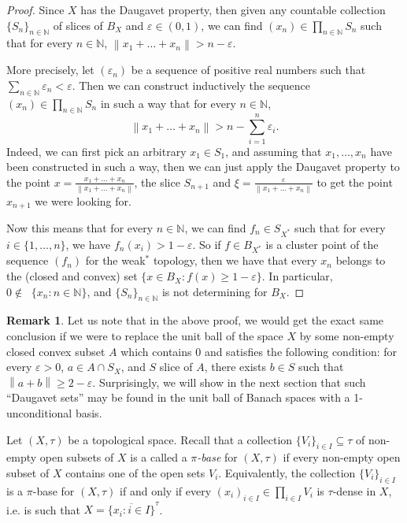 \documentclass[11pt,a4paper,reqno]{amsart}
\numberwithin{equation}{section}
\newcommand{\norm}[1]{\left\lVert#1\right\rVert}
\newcommand{\N}{\mathbb{N}}
\newcommand{\eps}{\varepsilon}
\DeclareMathOperator{\cconv}{\overline{conv}}
\newcommand{\1}{\mathbbm{1}}
\renewcommand{\geq}{\geqslant}
\theoremstyle{plain}
\theoremstyle{definition}
\newtheorem{remark}[theorem]{Remark}
\begin{document}
\begin{proof}
Since $X$ has the Daugavet property, then given any countable collection $\{S_n\}_{n\in \N}$ of slices of $B_X$ and $\eps\in(0,1)$, we can find $(x_n)\in \prod_{n\in\N} S_n$ such that for every $n\in\N$, $\norm{x_1+\dots+x_n}>n-\eps$.
   
More precisely, let $(\eps_n)$ be a sequence of positive real numbers such that $\sum_{n\in\N}\eps_n<\eps$. Then we can construct inductively the sequence $(x_n)\in\prod_{n\in\N} S_n$ in such a way that for every $n\in\N$, \begin{equation*}
\norm{x_1+\dots+x_n}>n-\sum_{i=1}^n\eps_i.
\end{equation*} Indeed, we can first pick an arbitrary $x_1\in S_1$, and assuming that $x_1,\dots,x_n$ have been constructed in such a way, then we can just apply the Daugavet property to the point $x=\frac{x_1+\dots+x_n}{\norm{x_1+\dots+x_n}}$, the slice $S_{n+1}$ and $\xi=\frac{\eps}{\norm{x_1+\dots+x_n}}$ to get the point $x_{n+1}$ we were looking for. 

Now this means that for every $n\in \N$, we can find $f_n\in S_{X^*}$ such that for every $i\in\{1,\dots,n\}$, we have $f_n(x_i)>1-\eps$. So if $f\in B_{X^*}$ is a cluster point of the sequence $(f_n)$ for the weak$^*$ topology, then we have that every $x_n$ belongs to the (closed and convex) set $\{x\in B_X\colon f(x)\geq 1-\eps\}$. In particular, $0\notin \cconv\{x_n\colon n\in\N\}$, and $\{S_n\}_{n\in \N}$ is not determining for $B_X$. 
\end{proof}

\begin{remark}\label{rem:Daugavet_sets_are_not_SCD}
Let us note that in the above proof, we would get the exact same conclusion if we were to replace the unit ball of the space $X$ by some non-empty closed convex subset $A$ which contains $0$ and satisfies the following condition: for every $\eps>0$, $a\in A\cap S_{X}$, and $S$ slice of $A$, there exists $b\in S$ such that $\norm{a+b}\geq 2-\eps$. Surprisingly, we will show in the next section that such ``Daugavet sets'' may be found in the unit ball of Banach spaces with a 1-unconditional basis.
\end{remark}

Let $(X,\tau)$ be a topological space. Recall that a collection $\{V_i\}_{i\in I}\subseteq\tau$ of non-empty open subsets of $X$ is a called a \emph{$\pi$-base} for $(X,\tau)$ if every non-empty open subset of $X$ contains one of the open sets $V_i$. Equivalently, the collection $\{V_i\}_{i\in I}$ is a $\pi$-base for $(X,\tau)$ if and only if every $(x_i)_{i\in I}\in\prod_{i\in I} V_i$ is $\tau$-dense in $X$, i.e. is such that $X=\overline{\{x_i\colon i\in I\}}^\tau$.
\end{document}

